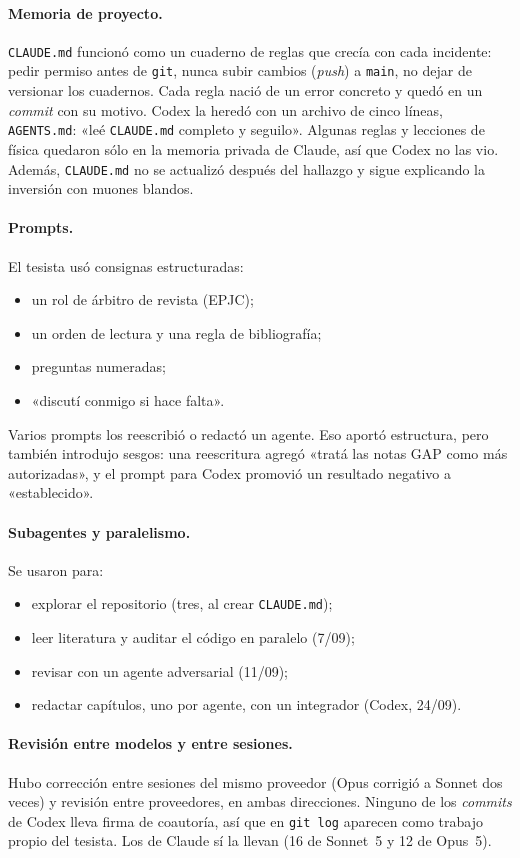 \documentclass[11pt,a4paper]{article}
\newcommand{\code}[1]{\texttt{#1}}
\begin{document}
\paragraph{Memoria de proyecto.} \code{CLAUDE.md} funcionó como un cuaderno de reglas que crecía con cada
incidente: pedir permiso antes de \code{git}, nunca subir cambios (\emph{push}) a \code{main}, no dejar de
versionar los cuadernos. Cada regla nació de un error concreto y quedó en un \emph{commit} con su motivo.
Codex la heredó con un archivo de cinco líneas, \code{AGENTS.md}: «leé \code{CLAUDE.md} completo y seguilo».
Algunas reglas y lecciones de física quedaron sólo en la memoria privada de Claude, así que Codex no las vio.
Además, \code{CLAUDE.md} no se actualizó después del hallazgo y sigue explicando la inversión con muones
blandos.

\paragraph{Prompts.} El tesista usó consignas estructuradas:
\begin{itemize}
  \item un rol de árbitro de revista (EPJC);
  \item un orden de lectura y una regla de bibliografía;
  \item preguntas numeradas;
  \item «discutí conmigo si hace falta».
\end{itemize}
Varios prompts los reescribió o redactó un agente. Eso aportó estructura, pero también introdujo sesgos: una
reescritura agregó «tratá las notas GAP como más autorizadas», y el prompt para Codex promovió un resultado
negativo a «establecido».

\paragraph{Subagentes y paralelismo.} Se usaron para:
\begin{itemize}
  \item explorar el repositorio (tres, al crear \code{CLAUDE.md});
  \item leer literatura y auditar el código en paralelo (7/09);
  \item revisar con un agente adversarial (11/09);
  \item redactar capítulos, uno por agente, con un integrador (Codex, 24/09).
\end{itemize}

\paragraph{Revisión entre modelos y entre sesiones.} Hubo corrección entre sesiones del mismo proveedor
(Opus corrigió a Sonnet dos veces) y revisión entre proveedores, en ambas direcciones. Ninguno de los
\emph{commits} de Codex lleva firma de coautoría, así que en \code{git log} aparecen como trabajo propio del
tesista. Los de Claude sí la llevan (16 de Sonnet~5 y 12 de Opus~5).
\end{document}
